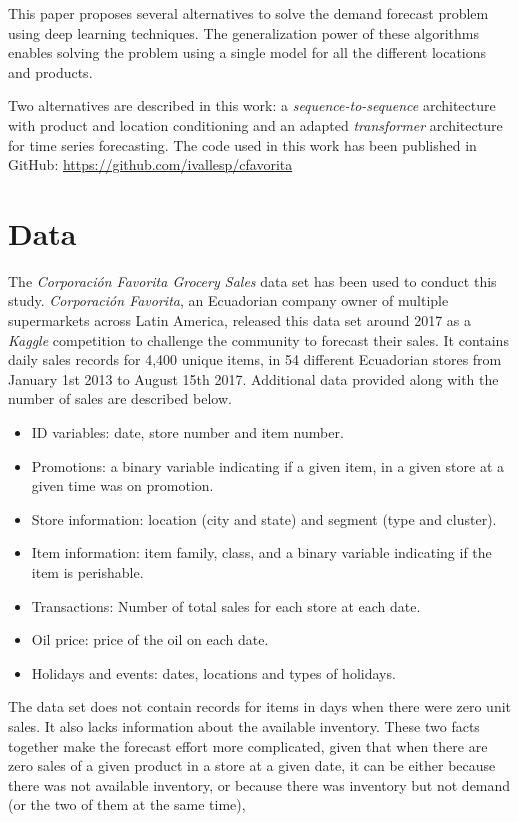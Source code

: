 \documentclass{elsarticle}
\begin{document}
	This paper proposes several alternatives to solve the demand forecast problem using deep learning techniques. The generalization power of these algorithms enables solving the problem using a single model for all the different locations and products. 
	
	Two alternatives are described in this work: a \textit{sequence-to-sequence} architecture with product and location conditioning and an adapted \textit{transformer} architecture for time series forecasting. The code used in this work has been published in GitHub: \url{https://github.com/ivallesp/cfavorita}
	
	\section{Data}
	The \textit{Corporación Favorita Grocery Sales} data set \cite{corporacionfavoritadataset2018} has been used to conduct this study. \textit{Corporación Favorita}, an Ecuadorian company owner of multiple supermarkets across Latin America, released this data set around 2017 as a \textit{Kaggle} competition to challenge the community to forecast their sales. It contains daily sales records for 4,400 unique items, in 54 different Ecuadorian stores from January 1st 2013 to August 15th 2017. Additional data provided along with the number of sales are described below.
	
	\begin{itemize}
		\item ID variables: date, store number and item number.
		\item Promotions: a binary variable indicating if a given item, in a given store at a given time was on promotion.
		\item Store information: location (city and state) and segment (type and cluster).
		\item Item information: item family, class, and a binary variable indicating if the item is perishable.
		\item Transactions: Number of total sales for each store at each date.
		\item Oil price: price of the oil on each date.
		\item Holidays and events: dates, locations and types of holidays.
	\end{itemize}

	The data set does not contain records for items in days when there were zero unit sales. It also lacks information about the available inventory. These two facts together make the forecast effort more complicated, given that when there are zero sales of a given product in a store at a given date, it can be either because there was not available inventory, or because there was inventory but not demand (or the two of them at the same time),
	
\end{document}
